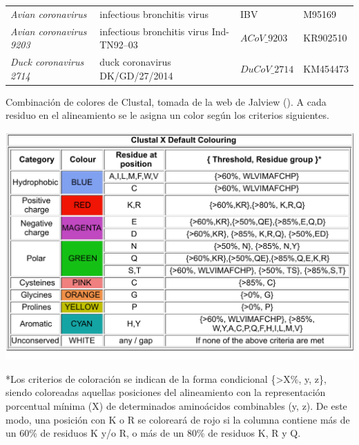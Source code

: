 \begin{table}[H]
    \centering
    \scriptsize 
    \setlength{\tabcolsep}{12pt}
    \begin{tabularx}{\textwidth}{@{}>{\raggedright\arraybackslash}p{4cm}>{\raggedright\arraybackslash}p{4cm}>{\raggedright\arraybackslash}p{3cm}>{\raggedright\arraybackslash}X@{}}
    \textit{Avian coronavirus}                                      & infectious bronchitis virus                          & IBV                                            &  M95169              \\
    \textit{Avian coronavirus 9203}                                 & infectious bronchitis virus Ind-TN92--03             & $ACoV\_{9203}$                                 &  KR902510            \\
    \textit{Duck coronavirus 2714}                                  & duck coronavirus DK/GD/27/2014                       & $DuCoV\_{2714}$                                &  KM454473            \\ \bottomrule
    \end{tabularx}
\end{table}

\begin{table}[H]
    \centering
    \caption{Combinación de colores de Clustal, tomada de la web de Jalview 
    (\cite{noauthor_clustal_nodate}). A cada residuo en el alineamiento se le 
    asigna un color según los criterios siguientes.}
    \includegraphics[width=\textwidth]{img/tabA2.pdf}
    \vspace{0.5cm}
    \begin{minipage}{\textwidth}
        \footnotesize
        *Los criterios de coloración se indican de la forma condicional 
        \{\textgreater{X\%}, y, z\}, siendo coloreadas aquellas posiciones del alineamiento
        con la representación porcentual mínima (X) de determinados aminoácidos 
        combinables (y, z). De este modo, una posición con K o R se coloreará de
        rojo si la columna contiene más de un 60\% de residuos K y/o R, o más de
        un 80\% de residuos K, R y Q.
    \end{minipage}
\end{table}
